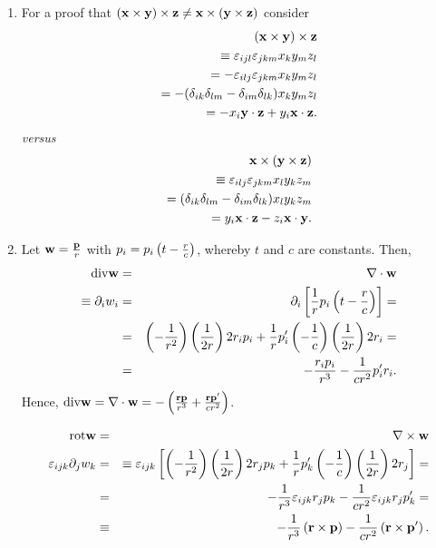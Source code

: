 {\begin{enumerate}
\item        For a proof that
$({{\bf x} } \times {{\bf y}})\times {{\bf z}}
\neq
{{\bf x} } \times ({{\bf y}}\times {{\bf z}})$ consider
\begin{equation}
\begin{split}
({{\bf x} } \times {{\bf y}})\times {{\bf z}}\\
\equiv
\varepsilon_{ijl}
\varepsilon_{jkm}
x_k y_m z_l\\=
-\varepsilon_{ilj}
\varepsilon_{jkm}
x_k y_m z_l\\ =
-(\delta_{ik}\delta_{lm}-
\delta_{im}\delta_{lk})
x_k y_m z_l\\ =
-x_i {{\bf y}}\cdot {{\bf z}}+
y_i {{\bf x}}\cdot {{\bf z}}.
\end{split}
\end{equation}
{\it versus}
\begin{equation}
\begin{split}
{{\bf x} } \times ({{\bf y}}\times {{\bf z}})\\
\equiv
\varepsilon_{ilj}
\varepsilon_{jkm}
x_l y_k z_m\\ =
(\delta_{ik}\delta_{lm}-
\delta_{im}\delta_{lk})
x_l y_k z_m\\ =
y_i {{\bf x}}\cdot {{\bf z}}-
z_i {{\bf x}}\cdot {{\bf y}}.
\end{split}
\end{equation}





\item
Let ${\bf w} = { {{\bf p}} \over r} $ with  $p_i=p_i\left(t  - {r \over c}\right)$,
whereby   $t$ and $c$  are constants. Then,
\begin{eqnarray*}
  \mbox{div}{\bf w}& = &
\nabla \cdot {\bf w}\\
\equiv \partial_i w_i & = & \partial_i
  \left[
    \frac{1}{r} p_i \left(t-\frac{r}{c}\right)
  \right]= \\
  & = & \left(-\frac{1}{r^2}\right)\left(\frac{1}{2r}\right)
    2r_i p_i+
    \frac{1}{r}p_i'\left(-\frac{1}{c}\right)
    \left(\frac{1}{2r}\right)2 r_i= \\
  & = & -\frac{r_i p_i}{r^3}-\frac{1}{c r^2}p_i' r_i
.
\end{eqnarray*}
Hence,
$
  \mbox{div}{\bf w}=\nabla \cdot {\bf w}=
  -\left(\frac{{\bf r} {\bf p}}{r^3}+\frac{{\bf r} {\bf p}'}{c r^2}\right)
$.



\begin{eqnarray*}
\mbox{rot}{\bf w}& =& \nabla \times {\bf w}  \\
  \varepsilon_{ijk}\partial_j w_k & = &
   \equiv  \varepsilon_{ijk}
    \left[
      \left(-\frac{1}{r^2}\right)\left(\frac{1}{2r}\right)
      2 r_j p_k +
      \frac{1}{r}p_k'
      \left(-\frac{1}{c}\right)\left(\frac{1}{2r}\right)2r_j
    \right]= \\
  & = & -\frac{1}{r^3}\varepsilon_{ijk}r_j p_k -\frac{1}{cr^2}
    \varepsilon_{ijk}r_j p_k' = \\
  & \equiv & -\frac{1}{r^3}\left({\bf r} \times {\bf p}\right)-
    \frac{1}{cr^2}\left({\bf r} \times {\bf p}'\right)   .
\end{eqnarray*}


\end{enumerate}}
